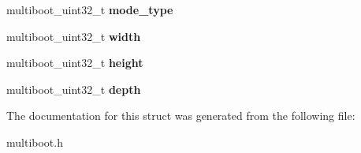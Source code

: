 \begin{DoxyCompactItemize}
\mbox{\label{structmultiboot__header_a4c90b7929342dd5aab7d08afa0906d28}} 
multiboot\+\_\+uint32\+\_\+t {\bfseries mode\+\_\+type}
\item 
\mbox{\label{structmultiboot__header_ad72a1a3dd608e73c818d0c27974def40}} 
multiboot\+\_\+uint32\+\_\+t {\bfseries width}
\item 
\mbox{\label{structmultiboot__header_a055c5e6553ea032897ad50a12f998a17}} 
multiboot\+\_\+uint32\+\_\+t {\bfseries height}
\item 
\mbox{\label{structmultiboot__header_aba85b53dc3af1bf99c71292a776e9dff}} 
multiboot\+\_\+uint32\+\_\+t {\bfseries depth}
\end{DoxyCompactItemize}


The documentation for this struct was generated from the following file\+:\begin{DoxyCompactItemize}
\item 
multiboot.\+h\end{DoxyCompactItemize}
